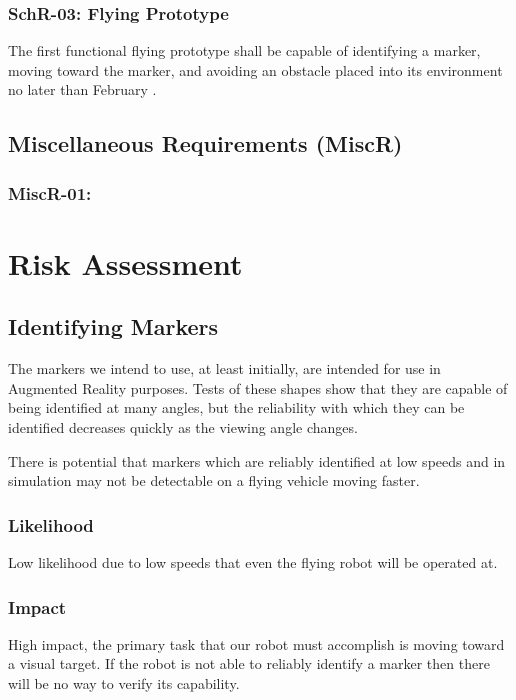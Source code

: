 \documentclass{article}
\begin{document}
		\subsubsection{SchR-03: Flying Prototype}
		
		The first functional flying prototype shall be capable of identifying a marker, moving toward the marker, and avoiding an obstacle placed into its environment no later than February  .
		
	\subsection{Miscellaneous Requirements (MiscR)}
	
		\subsubsection{MiscR-01: }

\section{Risk Assessment}

	\subsection{Identifying Markers}
	
	The markers we intend to use, at least initially, are intended for use in Augmented Reality purposes. Tests of these shapes show that they are capable of being identified at many angles, but the reliability with which they can be identified decreases quickly as the viewing angle changes. 
	
	There is potential that markers which are reliably identified at low speeds and in simulation may not be detectable on a flying vehicle moving faster.
	
		\subsubsection{Likelihood}
		
		Low likelihood due to low speeds that even the flying robot will be operated at.
		
		\subsubsection{Impact}
		
		High impact, the primary task that our robot must accomplish is moving toward a visual target. If the robot is not able to reliably identify a marker then there will be no way to verify its capability.
		
\end{document}
